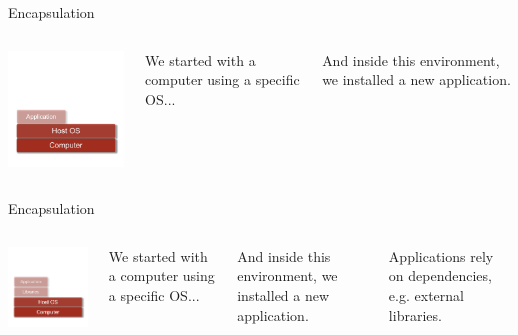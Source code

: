 \begin{frame}{Encapsulation}
\begin{columns}

\includegraphics[width=6cm]{02_encapsulation/figures/intro_1_app_nolib_50.pdf}

We started with a computer using a specific OS...


And inside this environment, we installed a new application.
\end{columns}
\end{frame}

\begin{frame}{Encapsulation}
\begin{columns}

\includegraphics[width=6cm]{02_encapsulation/figures/intro_1_app_51.pdf}

We started with a computer using a specific OS...


And inside this environment, we installed a new application.


Applications rely on dependencies, e.g. external libraries.

\end{columns}
\end{frame}

